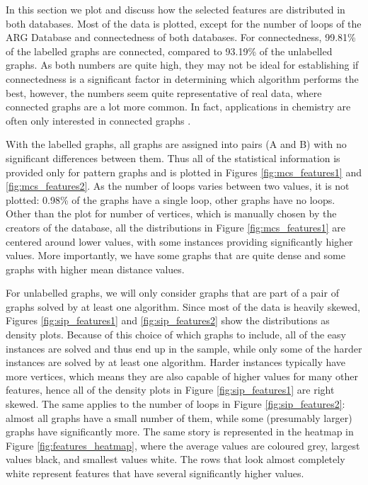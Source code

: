 \documentclass{l4proj}
\theoremstyle{definition}
\theoremstyle{remark}
\begin{document}
In this section we plot and discuss how the selected features are distributed in
both databases. Most of the data is plotted, except for the number of loops
of the ARG Database and connectedness of both databases. For connectedness,
99.81\% of the labelled graphs are connected, compared to 93.19\% of the
unlabelled graphs. As both numbers are quite high, they may not be ideal for
establishing if connectedness is a significant factor in determining which
algorithm performs the best, however, the numbers seem quite representative of
real data, where connected graphs are a lot more common. In fact, applications
in chemistry are often only interested in connected graphs \cite{WCMS:WCMS5}.

With the labelled graphs, all graphs are assigned into pairs (A and B) with no
significant differences between them. Thus all of the statistical information is
provided only for pattern graphs and is plotted in Figures
\ref{fig:mcs_features1} and \ref{fig:mcs_features2}. As the number of loops
varies between two values, it is not plotted: 0.98\% of the graphs have a
single loop, other graphs have no loops. Other than the plot for number of
vertices, which is manually chosen by the creators of the database, all the
distributions in Figure \ref{fig:mcs_features1} are centered around lower
values, with some instances providing significantly higher values. More
importantly, we have some graphs that are quite dense and some graphs with
higher mean distance values.

For unlabelled graphs, we will only consider graphs that are part of a pair of
graphs solved by at least one algorithm. Since most of the data is heavily
skewed, Figures \ref{fig:sip_features1} and \ref{fig:sip_features2} show the
distributions as density plots. Because of this choice of which graphs to
include, all of the easy instances are solved and thus end up in the sample,
while only some of the harder instances are solved by at least one algorithm.
Harder instances typically have more vertices, which means they are also capable
of higher values for many other features, hence all of the density plots in
Figure \ref{fig:sip_features1} are right skewed. The same applies to the number
of loops in Figure \ref{fig:sip_features2}: almost all graphs have a small
number of them, while some (presumably larger) graphs have significantly more.
The same story is represented in the heatmap in Figure
\ref{fig:features_heatmap}, where the average values are coloured grey, largest
values black, and smallest values white. The rows that look almost completely
white represent features that have several significantly higher values.
\end{document}
